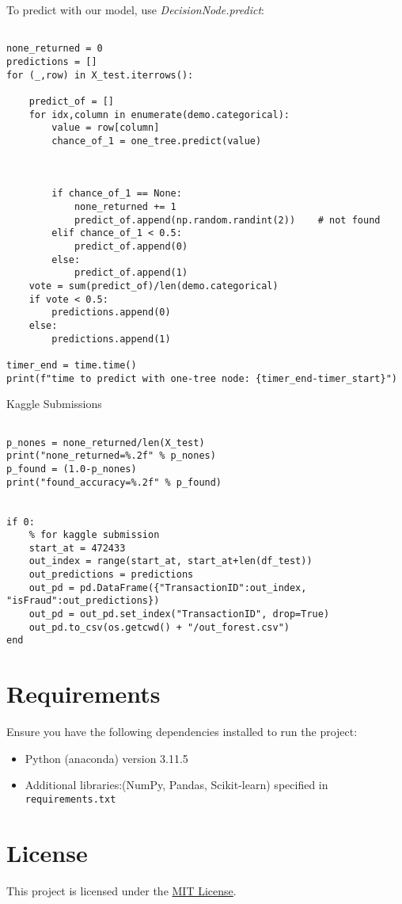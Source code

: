 \documentclass{article}
\begin{document}
To predict with our model, use \textit{DecisionNode.predict}:
\begin{verbatim}

none_returned = 0
predictions = []
for (_,row) in X_test.iterrows():

    predict_of = []
    for idx,column in enumerate(demo.categorical):
        value = row[column]
        chance_of_1 = one_tree.predict(value)


        
        if chance_of_1 == None:
            none_returned += 1
            predict_of.append(np.random.randint(2))    # not found
        elif chance_of_1 < 0.5:
            predict_of.append(0)
        else:
            predict_of.append(1)
    vote = sum(predict_of)/len(demo.categorical)
    if vote < 0.5:
        predictions.append(0)
    else:
        predictions.append(1)

timer_end = time.time()
print(f"time to predict with one-tree node: {timer_end-timer_start}")

\end{verbatim}

Kaggle Submissions
\begin{verbatim}
    
p_nones = none_returned/len(X_test)
print("none_returned=%.2f" % p_nones)
p_found = (1.0-p_nones)
print("found_accuracy=%.2f" % p_found)        


if 0:
    % for kaggle submission
    start_at = 472433
    out_index = range(start_at, start_at+len(df_test))
    out_predictions = predictions
    out_pd = pd.DataFrame({"TransactionID":out_index, "isFraud":out_predictions})
    out_pd = out_pd.set_index("TransactionID", drop=True)
    out_pd.to_csv(os.getcwd() + "/out_forest.csv")
end

\end{verbatim}


\section*{Requirements}

Ensure you have the following dependencies installed to run the project:

\begin{itemize}
    \item Python (anaconda) version 3.11.5
    \item Additional libraries:(NumPy, Pandas, Scikit-learn) specified in \texttt{requirements.txt}
\end{itemize}

\section*{License}

This project is licensed under the \href{https://opensource.org/licenses/MIT}{MIT License}.
\end{document}
